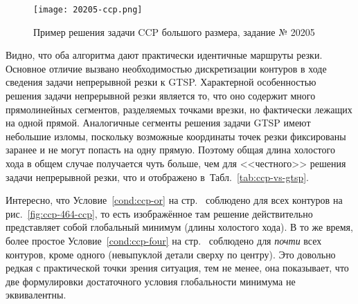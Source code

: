 \begin{figure}
  \centering
  \texttt{[image: 20205-ccp.png]}
  \caption{Пример решения задачи CCP большого размера, задание № 20205}
  \label{fig:ccp-20205}
\end{figure}

Видно,
что оба алгоритма дают практически идентичные
маршруты резки.
Основное отличие вызвано необходимостью дискретизации
контуров в ходе сведения задачи
непрерывной резки к GTSP.
Характерной особенностью
решения задачи непрерывной резки
является то,
что оно
содержит много прямолинейных сегментов,
разделяемых точками врезки,
но фактически лежащих на одной прямой.
Аналогичные сегменты решения задачи GTSP
имеют небольшие изломы,
поскольку возможные координаты точек резки
фиксированы заранее и не могут попасть на одну прямую.
Поэтому общая длина холостого хода
в общем случае получается чуть больше,
чем для <<честного>> решения задачи непрерывной резки,
что и отображено
в~Табл.~\ref{tab:ccp-vs-gtsp}.

Интересно,
что
Условие~\ref{cond:ccp-or}
на стр.~\pageref{cond:ccp-or}
соблюдено для всех контуров
на рис.~\ref{fig:ccp-464-ccp},
то есть изображённое там решение
действительно представляет собой
глобальный минимум
(длины холостого хода).
В то же время,
более простое
Условие~\ref{cond:ccp-four}
на стр.~\pageref{cond:ccp-four}
соблюдено для
\textit{почти}
всех контуров,
кроме одного
(невыпуклой детали сверху по центру).
Это довольно редкая
с практической точки зрения ситуация,
тем не менее,
она показывает,
что две формулировки
достаточного условия
глобальности минимума
не эквивалентны.
